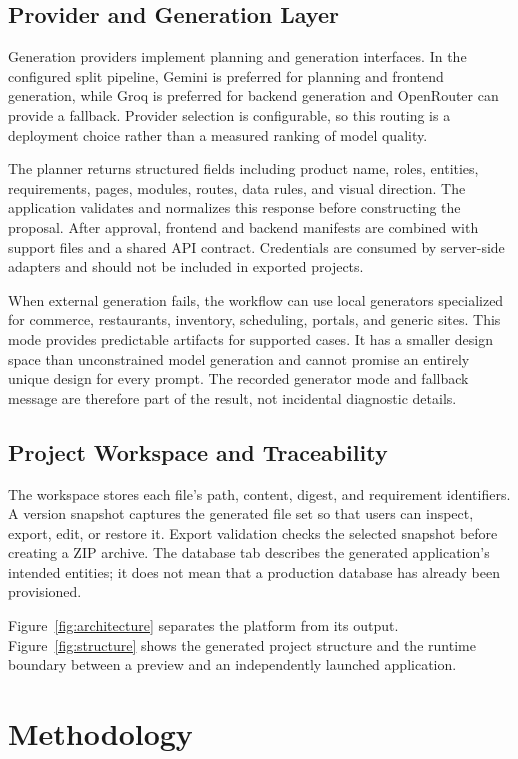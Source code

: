 \documentclass[conference,a4paper]{IEEEtran}
\begin{document}
\subsection{Provider and Generation Layer}
Generation providers implement planning and generation interfaces. In the configured split pipeline, Gemini is preferred for planning and frontend generation, while Groq is preferred for backend generation and OpenRouter can provide a fallback. Provider selection is configurable, so this routing is a deployment choice rather than a measured ranking of model quality.

The planner returns structured fields including product name, roles, entities, requirements, pages, modules, routes, data rules, and visual direction. The application validates and normalizes this response before constructing the proposal. After approval, frontend and backend manifests are combined with support files and a shared API contract. Credentials are consumed by server-side adapters and should not be included in exported projects.

When external generation fails, the workflow can use local generators specialized for commerce, restaurants, inventory, scheduling, portals, and generic sites. This mode provides predictable artifacts for supported cases. It has a smaller design space than unconstrained model generation and cannot promise an entirely unique design for every prompt. The recorded generator mode and fallback message are therefore part of the result, not incidental diagnostic details.

\subsection{Project Workspace and Traceability}
The workspace stores each file's path, content, digest, and requirement identifiers. A version snapshot captures the generated file set so that users can inspect, export, edit, or restore it. Export validation checks the selected snapshot before creating a ZIP archive. The database tab describes the generated application's intended entities; it does not mean that a production database has already been provisioned.

Figure~\ref{fig:architecture} separates the platform from its output. Figure~\ref{fig:structure} shows the generated project structure and the runtime boundary between a preview and an independently launched application.

\section{Methodology}
\end{document}
